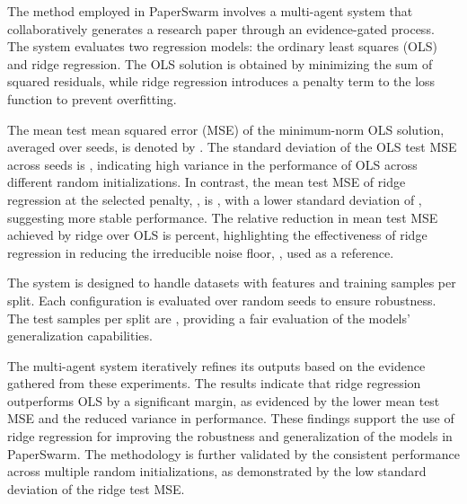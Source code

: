 The method employed in PaperSwarm involves a multi-agent system that collaboratively generates a research paper through an evidence-gated process. The system evaluates two regression models: the ordinary least squares (OLS) and ridge regression. The OLS solution is obtained by minimizing the sum of squared residuals, while ridge regression introduces a penalty term to the loss function to prevent overfitting.

The mean test mean squared error (MSE) of the minimum-norm OLS solution, averaged over  seeds, is denoted by . The standard deviation of the OLS test MSE across seeds is , indicating high variance in the performance of OLS across different random initializations. In contrast, the mean test MSE of ridge regression at the selected penalty, , is , with a lower standard deviation of , suggesting more stable performance. The relative reduction in mean test MSE achieved by ridge over OLS is  percent, highlighting the effectiveness of ridge regression in reducing the irreducible noise floor, , used as a reference.

The system is designed to handle datasets with  features and  training samples per split. Each configuration is evaluated over  random seeds to ensure robustness. The test samples per split are , providing a fair evaluation of the models' generalization capabilities.

The multi-agent system iteratively refines its outputs based on the evidence gathered from these experiments. The results indicate that ridge regression outperforms OLS by a significant margin, as evidenced by the lower mean test MSE and the reduced variance in performance. These findings support the use of ridge regression for improving the robustness and generalization of the models in PaperSwarm. The methodology is further validated by the consistent performance across multiple random initializations, as demonstrated by the low standard deviation of the ridge test MSE.
